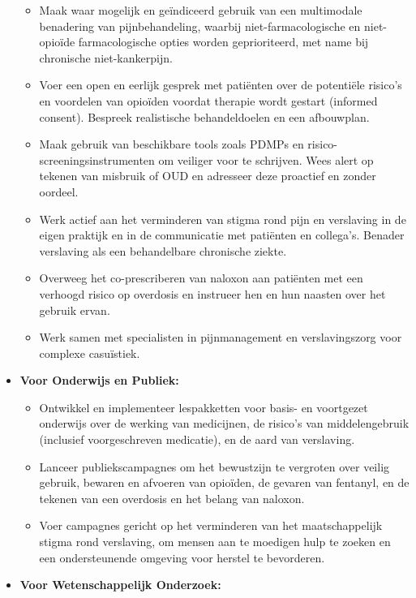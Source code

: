\documentclass[11pt, a4paper]{report} %
\begin{document}
\begin{itemize}
\begin{itemize}
            \item Maak waar mogelijk en geïndiceerd gebruik van een multimodale benadering van pijnbehandeling, waarbij niet-farmacologische en niet-opioïde farmacologische opties worden geprioriteerd, met name bij chronische niet-kankerpijn.
            \item Voer een open en eerlijk gesprek met patiënten over de potentiële risico's en voordelen van opioïden voordat therapie wordt gestart (informed consent). Bespreek realistische behandeldoelen en een afbouwplan.
            \item Maak gebruik van beschikbare tools zoals PDMPs en risico-screeningsinstrumenten om veiliger voor te schrijven. Wees alert op tekenen van misbruik of OUD en adresseer deze proactief en zonder oordeel.
            \item Werk actief aan het verminderen van stigma rond pijn en verslaving in de eigen praktijk en in de communicatie met patiënten en collega's. Benader verslaving als een behandelbare chronische ziekte.
            \item Overweeg het co-prescriberen van naloxon aan patiënten met een verhoogd risico op overdosis en instrueer hen en hun naasten over het gebruik ervan.
            \item Werk samen met specialisten in pijnmanagement en verslavingszorg voor complexe casuïstiek.
        \end{itemize}
    \item \textbf{Voor Onderwijs en Publiek:}
        \begin{itemize}
            \item Ontwikkel en implementeer lespakketten voor basis- en voortgezet onderwijs over de werking van medicijnen, de risico's van middelengebruik (inclusief voorgeschreven medicatie), en de aard van verslaving.
            \item Lanceer publiekscampagnes om het bewustzijn te vergroten over veilig gebruik, bewaren en afvoeren van opioïden, de gevaren van fentanyl, en de tekenen van een overdosis en het belang van naloxon.
            \item Voer campagnes gericht op het verminderen van het maatschappelijk stigma rond verslaving, om mensen aan te moedigen hulp te zoeken en een ondersteunende omgeving voor herstel te bevorderen.
        \end{itemize}
    \item \textbf{Voor Wetenschappelijk Onderzoek:}
        \begin{itemize}

\end{itemize}
\end{itemize}
\end{document}
